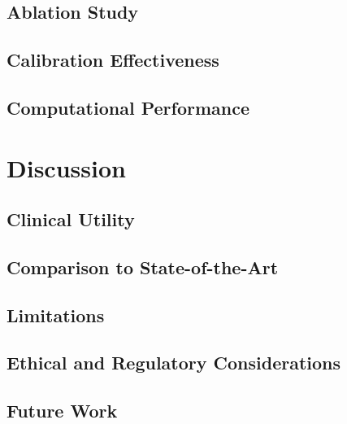 \documentclass[10pt, conference, compsocconf]{IEEEtran}
\begin{document}
\subsection{Ablation Study}

\subsection{Calibration Effectiveness}

\subsection{Computational Performance}

\section{Discussion}
\label{sec:discussion}

\subsection{Clinical Utility}

\subsection{Comparison to State-of-the-Art}

\subsection{Limitations}

\subsection{Ethical and Regulatory Considerations}

\subsection{Future Work}
\end{document}
